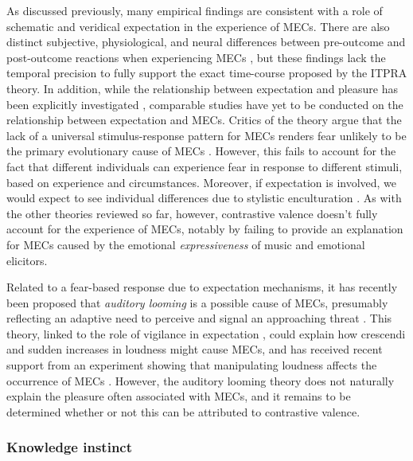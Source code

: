 As discussed previously, many empirical findings are consistent with a role of schematic and veridical expectation in the experience of MECs. There are also distinct subjective, physiological, and neural differences between pre-outcome and post-outcome reactions when experiencing MECs \parencite{bannister2018, grewe2009a, salimpoor2011, wassiliwizky2017b}, but these findings lack the temporal precision to fully support the exact time-course proposed by the ITPRA theory. In addition, while the relationship between expectation and pleasure has been explicitly investigated \parencite{cheung2019, gold2019}, comparable studies have yet to be conducted on the relationship between expectation and MECs. Critics of the theory argue that the lack of a universal stimulus-response pattern for MECs renders fear unlikely to be the primary evolutionary cause of MECs \parencite{bannister2020a, grewe2007, nagel2008}. However, this fails to account for the fact that different individuals can experience fear in response to different stimuli, based on experience and circumstances. Moreover, if expectation is involved, we would expect to see individual differences due to stylistic enculturation \parencites{pearce2018}[and for partial support of an effect of stylistic knowledge, see][]{beier2020}. As with the other theories reviewed so far, however, contrastive valence doesn’t fully account for the experience of MECs, notably by failing to provide an explanation for MECs caused by the emotional \emph{expressiveness} of music \parencite{levinson2006} and emotional elicitors.

Related to a fear-based response due to expectation mechanisms, it has recently been proposed that \emph{auditory looming} is a possible cause of MECs, presumably reflecting an adaptive need to perceive and signal an approaching threat \parencite{bannister2018, bannister2019, bannister2020b}. This theory, linked to the role of vigilance in expectation \parencite{huron2006}, could explain how crescendi and sudden increases in loudness might cause MECs, and has received recent support from an experiment showing that manipulating loudness affects the occurrence of MECs \parencite{bannister2020b}. However, the auditory looming theory does not naturally explain the pleasure often associated with MECs, and it remains to be determined whether or not this can be attributed to contrastive valence.

\subsubsection{Knowledge instinct}

